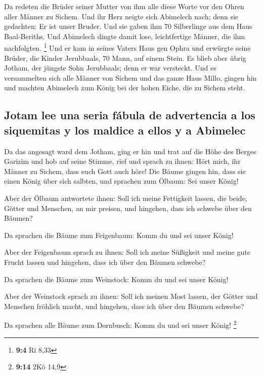  Da redeten die Brüder seiner Mutter von ihm alle diese
Worte vor den Ohren aller Männer zu Sichem. Und ihr Herz neigte sich
Abimelech nach; denn sie gedachten: Er ist unser Bruder. 
Und sie gaben ihm 70 Silberlinge aus dem Haus Baal-Beriths. Und
Abimelech dingte damit lose, leichtfertige Männer, die ihm nachfolgten.
\footnote{\textbf{9:4} Ri 8,33}  Und er kam in seines
Vaters Haus gen Ophra und erwürgte seine Brüder, die Kinder Jerubbaals,
70 Mann, auf einem Stein. Es blieb aber übrig Jotham, der jüngste Sohn
Jerubbaals; denn er war versteckt.  Und es versammelten
sich alle Männer von Sichem und das ganze Haus Millo, gingen hin und
machten Abimelech zum König bei der hohen Eiche, die zu Sichem steht.

\hypertarget{jotam-lee-una-seria-fuxe1bula-de-advertencia-a-los-siquemitas-y-los-maldice-a-ellos-y-a-abimelec}{%
\subsection{Jotam lee una seria fábula de advertencia a los siquemitas y
los maldice a ellos y a
Abimelec}\label{jotam-lee-una-seria-fuxe1bula-de-advertencia-a-los-siquemitas-y-los-maldice-a-ellos-y-a-abimelec}}

 Da das angesagt ward dem Jotham, ging er hin und trat auf
die Höhe des Berges Garizim und hob auf seine Stimme, rief und sprach zu
ihnen: Hört mich, ihr Männer zu Sichem, dass euch Gott auch höre!
 Die Bäume gingen hin, dass sie einen König über sich
salbten, und sprachen zum Ölbaum: Sei unser König!

 Aber der Ölbaum antwortete ihnen: Soll ich meine
Fettigkeit lassen, die beide, Götter und Menschen, an mir preisen, und
hingehen, dass ich schwebe über den Bäumen?

 Da sprachen die Bäume zum Feigenbaum: Komm du und sei
unser König!

 Aber der Feigenbaum sprach zu ihnen: Soll ich meine
Süßigkeit und meine gute Frucht lassen und hingehen, dass ich über den
Bäumen schwebe?

 Da sprachen die Bäume zum Weinstock: Komm du und sei
unser König!

 Aber der Weinstock sprach zu ihnen: Soll ich meinen Most
lassen, der Götter und Menschen fröhlich macht, und hingehen, dass ich
über den Bäumen schwebe?

 Da sprachen alle Bäume zum Dornbusch: Komm du und sei
unser König! \footnote{\textbf{9:14} 2Kö 14,9}

